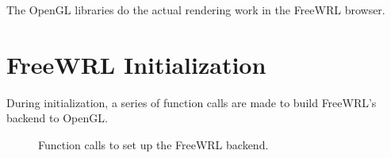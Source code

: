 \documentclass[12pt,letterpaper]{article}
\begin{document}
    The OpenGL libraries do the actual rendering work in the FreeWRL
    browser.

    \section{FreeWRL Initialization}

    During initialization, a series of function calls are made to
    build FreeWRL's backend to OpenGL.

    \begin{figure}[!ht]
	\centering
	\caption{Function calls to set up the FreeWRL backend.}\label{fig:be-setup}
    \end{figure}
\end{document}
